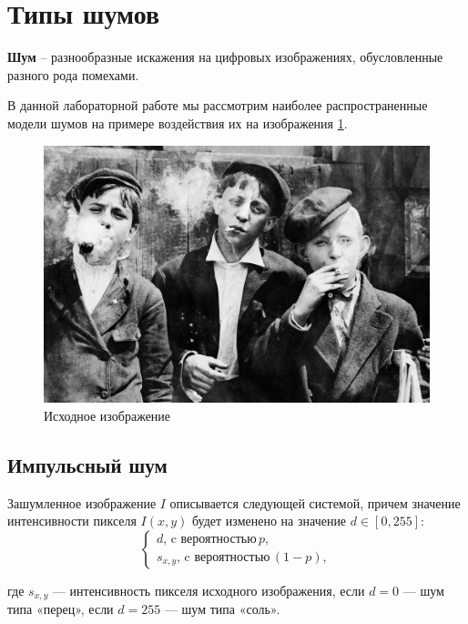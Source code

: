 \section{Типы шумов}

\textbf{Шум} -- разнообразные искажения на цифровых изображениях, обусловленные разного рода помехами.

В данной лабораторной работе мы рассмотрим наиболее распространенные модели шумов на примере воздействия их на изображения \ref{img:source}. 

\begin{figure}[ht!!]
    \centering
    \includegraphics[width=\textwidth]{../lewis-hine-taschen-main-3.jpg}
    \caption{Исходное изображение}
    \label{img:source}  
\end{figure}
\FloatBarrier

\subsection{Импульсный шум}
Зашумленное изображение $I$ описывается следующей системой, причем значение интенсивности пикселя $I(x,y)$ будет изменено на значение $d \in [0,255]$:
\begin{equation}
    \begin{cases} d,\, \text{c вероятностью}\, p, \\
    s_{x,y},\, \text{c вероятностью}\, (1-p),
    \end{cases}
\end{equation}

где $s_{x,y}$ — интенсивность пикселя исходного изображения, если $d = 0$ — шум типа «перец», если
$d = 255$ — шум типа «соль».

